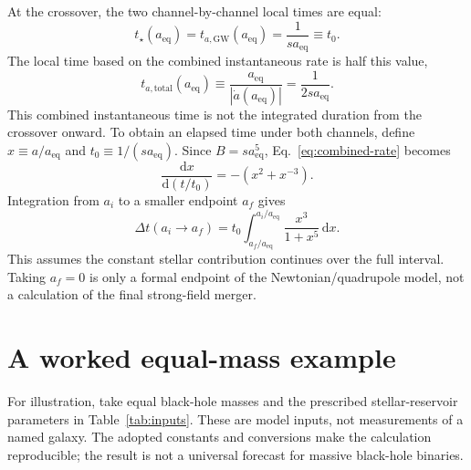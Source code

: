 \documentclass[12pt]{article}
\begin{document}
At the crossover, the two channel-by-channel local times are equal:
\begin{equation}
  t_\star(a_{\mathrm{eq}})
  =t_{a,\mathrm{GW}}(a_{\mathrm{eq}})
  =\frac{1}{s a_{\mathrm{eq}}}
  \equiv t_0.
  \label{eq:equal-local-times}
\end{equation}
The local time based on the combined instantaneous rate is half this value,
\begin{equation}
  t_{a,\mathrm{total}}(a_{\mathrm{eq}})
  \equiv\frac{a_{\mathrm{eq}}}{|\dot a(a_{\mathrm{eq}})|}
  =\frac{1}{2s a_{\mathrm{eq}}}.
  \label{eq:combined-local-time}
\end{equation}
This combined instantaneous time is not the integrated duration from the crossover onward. To obtain an elapsed time under both channels, define $x\equiv a/a_{\mathrm{eq}}$ and $t_0\equiv1/(s a_{\mathrm{eq}})$. Since $B=s a_{\mathrm{eq}}^5$, Eq.~\eqref{eq:combined-rate} becomes
\begin{equation}
  \frac{\mathrm{d}x}{\mathrm{d}(t/t_0)}
  =-(x^2+x^{-3}).
\end{equation}
Integration from $a_i$ to a smaller endpoint $a_f$ gives
\begin{equation}
  \Delta t(a_i\to a_f)=t_0
  \int_{a_f/a_{\mathrm{eq}}}^{a_i/a_{\mathrm{eq}}}
  \frac{x^3}{1+x^5}\,\mathrm{d}x.
  \label{eq:combined-elapsed-time}
\end{equation}
This assumes the constant stellar contribution continues over the full interval. Taking $a_f=0$ is only a formal endpoint of the Newtonian/quadrupole model, not a calculation of the final strong-field merger.

\section{A worked equal-mass example}

For illustration, take equal black-hole masses and the prescribed stellar-reservoir parameters in Table~\ref{tab:inputs}. These are model inputs, not measurements of a named galaxy. The adopted constants and conversions make the calculation reproducible; the result is not a universal forecast for massive black-hole binaries.
\end{document}
